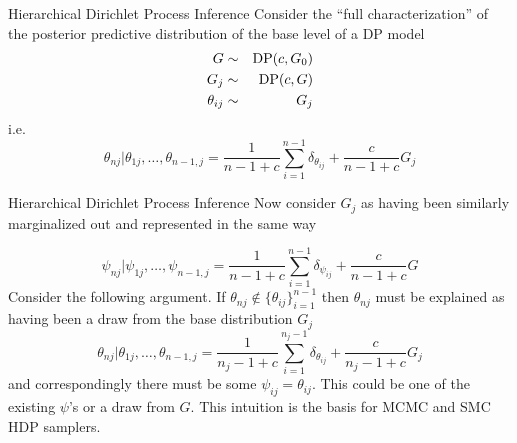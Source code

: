 \begin{frame}[t]{Hierarchical Dirichlet Process Inference}
Consider the ``full characterization'' of the posterior predictive distribution of the base level of a DP model
\begin{eqnarray*}
G &\sim& \DP(c,G_0) \\
G_j &\sim& \DP(c,G) \\
\theta_{ij} &\sim& G_j \\
\end{eqnarray*} 
i.e.
\[\theta_{nj} | \theta_{1j}, \ldots, \theta_{n-1,j} =  \frac{1}{n-1+c}\sum_{i=1}^{n-1}\delta_{\theta_{ij}} + \frac{c}{n-1+c}G_j\]

\end{frame}

\begin{frame}[t]{Hierarchical Dirichlet Process Inference}
Now consider $G_j$ as having been similarly marginalized out and represented in the same way

\[\psi_{nj} | \psi_{1j}, \ldots, \psi_{n-1,j} =  \frac{1}{n-1+c}\sum_{i=1}^{n-1}\delta_{\psi_{ij}} + \frac{c}{n-1+c}G\]
Consider the following argument.  If $\theta_{nj} \notin \{\theta_{ij}\}_{i=1}^{n-1}$ then $\theta_{nj}$ must be explained as having been a draw from the base distribution $G_j$
\[\theta_{nj} | \theta_{1j}, \ldots, \theta_{n-1,j} =  \frac{1}{n_j-1+c}\sum_{i=1}^{n_j-1}\delta_{\theta_{ij}} + \frac{c}{n_j-1+c}G_j\]
and correspondingly there must be some $\psi_{ij} = \theta_{ij}$.  This could be one of the existing $\psi$'s or a draw from $G$. This intuition is the basis for MCMC and SMC HDP samplers.  


\end{frame}